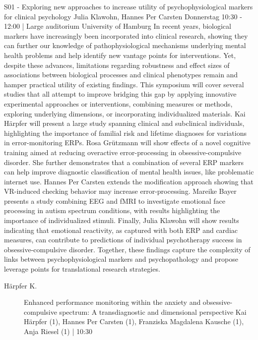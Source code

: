 
            \begin{symposium}
            {S01 - Exploring new approaches to increase utility of psychophysiological markers for clinical psychology}
            {Julia Klawohn, Hannes Per Carsten}
            {Donnerstag 10:30 - 12:00 | Large auditorium}
            {University of Hamburg}
            In recent years, biological markers have increasingly been incorporated into clinical research, showing they can further our knowledge of pathophysiological mechanisms underlying mental health problems and help identify new vantage points for interventions. Yet, despite these advances, limitations regarding robustness and effect sizes of associations between biological processes and clinical phenotypes remain and hamper practical utility of existing findings. This symposium will cover several studies that all attempt to improve bridging this gap by applying innovative experimental approaches or interventions, combining measures or methods, exploring underlying dimensions, or incorporating individualized materials. Kai Härpfer will present a large study spanning clinical and subclinical individuals, highlighting the importance of familial risk and lifetime diagnoses for variations in error-monitoring ERPs. Rosa Grützmann will show effects of a novel cognitive training aimed at reducing overactive error-processing in obsessive-compulsive disorder. She further demonstrates that a combination of several ERP markers can help improve diagnostic classification of mental health issues, like problematic internet use. Hannes Per Carsten extends the modification approach showing that VR-induced checking behavior may increase error-processing. Mareike Bayer presents a study combining EEG and fMRI to investigate emotional face processing in autism spectrum conditions, with results highlighting the importance of individualized stimuli. Finally, Julia Klawohn will show results indicating that emotional reactivity, as captured with both ERP and cardiac measures, can contribute to predictions of individual psychotherapy success in obsessive-compulsive disorder. Together, these findings capture the complexity of links between psychophysiological markers and psychopathology and propose leverage points for translational research strategies.
            \begin{description}    
            
                \item [ Härpfer K.] Enhanced performance monitoring within the anxiety and obsessive-compulsive spectrum: A transdiagnostic and dimensional perspective
Kai Härpfer (1), Hannes Per Carsten (1), Franziska Magdalena Kausche (1), Anja Riesel (1) \textcolor{mygray}{ | 10:30}    
                

\end{description}
\end{symposium}
